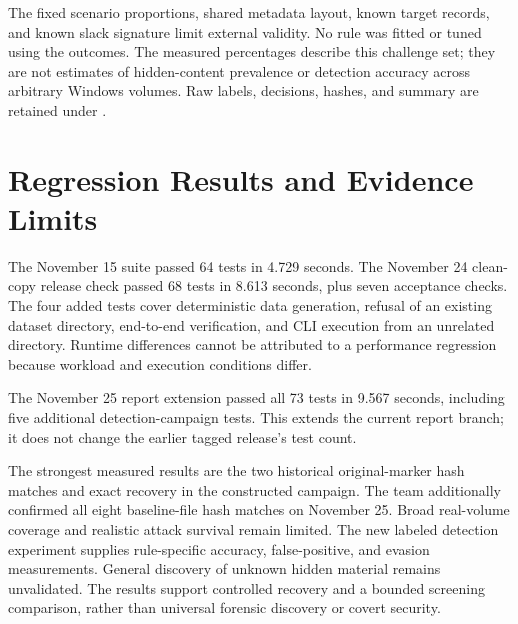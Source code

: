 The fixed scenario proportions, shared metadata layout, known target records,
and known slack signature limit external validity. No rule was fitted or tuned
using the outcomes. The measured percentages describe this challenge set;
they are not estimates of hidden-content prevalence or detection accuracy
across arbitrary Windows volumes. Raw labels, decisions, hashes, and summary
are retained under .

\section{Regression Results and Evidence Limits}
The November 15 suite passed 64 tests in 4.729 seconds. The November 24
clean-copy release check passed 68 tests in 8.613 seconds, plus seven
acceptance checks. The four added tests cover deterministic data generation,
refusal of an existing dataset directory, end-to-end verification, and CLI
execution from an unrelated directory. Runtime differences cannot be
attributed to a performance regression because workload and execution
conditions differ.

The November 25 report extension passed all 73 tests in 9.567 seconds,
including five additional detection-campaign tests. This extends the current
report branch; it does not change the earlier tagged release's test count.

The strongest measured results are the two historical original-marker hash
matches and exact recovery in the constructed campaign. The team additionally
confirmed all eight baseline-file hash matches on November 25. Broad real-volume
coverage and realistic attack survival remain limited. The new labeled
detection experiment supplies rule-specific accuracy, false-positive, and
evasion measurements. General discovery of unknown hidden material remains
unvalidated. The results support controlled recovery and a bounded screening
comparison, rather than universal forensic discovery or covert security.
